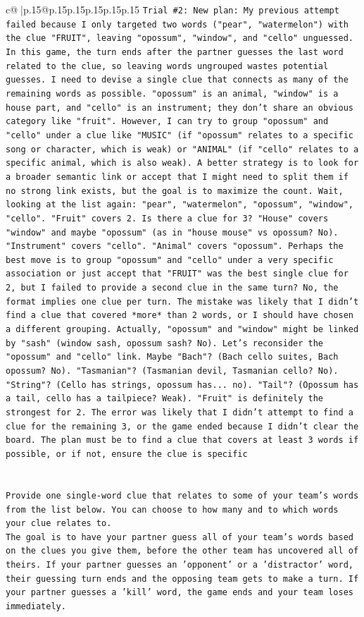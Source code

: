\documentclass{article}
\begin{document}
{\begin{supertabular}{c@{$\;$}|p{.15\linewidth}@{}p{.15\linewidth}p{.15\linewidth}p{.15\linewidth}p{.15\linewidth}p{.15\linewidth}}
{{{\texttt{Trial \#2: New plan: My previous attempt failed because I only targeted two words ("pear", "watermelon") with the clue "FRUIT", leaving "opossum", "window", and "cello" unguessed. In this game, the turn ends after the partner guesses the last word related to the clue, so leaving words ungrouped wastes potential guesses. I need to devise a single clue that connects as many of the remaining words as possible. "opossum" is an animal, "window" is a house part, and "cello" is an instrument; they don't share an obvious category like "fruit". However, I can try to group "opossum" and "cello" under a clue like "MUSIC" (if "opossum" relates to a specific song or character, which is weak) or "ANIMAL" (if "cello" relates to a specific animal, which is also weak). A better strategy is to look for a broader semantic link or accept that I might need to split them if no strong link exists, but the goal is to maximize the count. Wait, looking at the list again: "pear", "watermelon", "opossum", "window", "cello". "Fruit" covers 2. Is there a clue for 3? "House" covers "window" and maybe "opossum" (as in "house mouse" vs opossum? No). "Instrument" covers "cello". "Animal" covers "opossum". Perhaps the best move is to group "opossum" and "cello" under a very specific association or just accept that "FRUIT" was the best single clue for 2, but I failed to provide a second clue in the same turn? No, the format implies one clue per turn. The mistake was likely that I didn't find a clue that covered *more* than 2 words, or I should have chosen a different grouping. Actually, "opossum" and "window" might be linked by "sash" (window sash, opossum sash? No). Let's reconsider the "opossum" and "cello" link. Maybe "Bach"? (Bach cello suites, Bach opossum? No). "Tasmanian"? (Tasmanian devil, Tasmanian cello? No). "String"? (Cello has strings, opossum has... no). "Tail"? (Opossum has a tail, cello has a tailpiece? Weak). "Fruit" is definitely the strongest for 2. The error was likely that I didn't attempt to find a clue for the remaining 3, or the game ended because I didn't clear the board. The plan must be to find a clue that covers at least 3 words if possible, or if not, ensure the clue is specific} \\
\\ 
\\ 
\texttt{Provide one single{-}word clue that relates to some of your team's words from the list below. You can choose to how many and to which words your clue relates to.} \\
\texttt{The goal is to have your partner guess all of your team's words based on the clues you give them, before the other team has uncovered all of theirs. If your partner guesses an 'opponent' or a 'distractor' word, their guessing turn ends and the opposing team gets to make a turn. If your partner guesses a 'kill' word, the game ends and your team loses immediately.} \\
}}}
\end{supertabular}}
\end{document}
